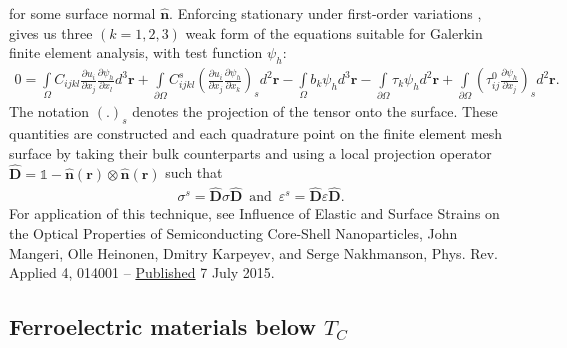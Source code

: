 \documentclass[22pt]{article} %
\begin{document}
%
for some surface normal $\mathbf{\hat{n}}$.
%
Enforcing stationary under first-order variations \cite{BowerBook}, gives us three $(k = 1,2,3)$ weak form of the equations suitable for Galerkin finite element analysis, with test function $\psi_h$:
%
\begin{align}\tag{3.8}
 0 = \int\limits_\Omega C_{ijkl} \frac{\partial u_i}{\partial x_j} \frac{\partial \psi_h}{\partial x_l} d^3 \textbf{r} + \int\limits_{\partial \Omega} C_{ijkl}^s \left(\frac{\partial u_i}{\partial x_j} \frac{\partial \psi_h}{\partial x_k} \right)_s d^2 \textbf{r} - \int\limits_\Omega b_k \psi_h d^3 \textbf{r} - \int\limits_{\partial \Omega} \tau_k \psi_h d^2 \textbf{r} + \int\limits_{\partial \Omega} \left(\tau_{ij}^0 \frac{\partial \psi_h}{\partial x_j} \right)_s d^2 \textbf{r}.
\end{align}
%
The notation $\left( . \right)_s$ denotes the projection of the tensor onto the surface.
%
These quantities are constructed and each quadrature point on the finite element mesh surface by taking their bulk counterparts and using a local projection operator $\mathbf{\hat{\textbf{D}}} = \mathds{1} - \mathbf{\hat{n}}(\textbf{r}) \otimes \mathbf{\hat{n}} (\textbf{r})$ \cite{Yvonnet2012} such that 
%
\begin{align}\tag{3.9}
\sigma^s = \mathbf{\hat{\textbf{D}}} \sigma \mathbf{\hat{\textbf{D}}} \,\,\,\mathrm{and}\,\,\, \varepsilon^s = \mathbf{\hat{\textbf{D}}} \varepsilon \mathbf{\hat{\textbf{D}}}.
\end{align}
%
For application of this technique, see Influence of Elastic and Surface Strains on the Optical Properties of Semiconducting Core-Shell Nanoparticles,
John Mangeri, Olle Heinonen, Dmitry Karpeyev, and Serge Nakhmanson, Phys. Rev. Applied 4, 014001 -- \href{http://journals.aps.org/prapplied/abstract/10.1103/PhysRevApplied.4.014001}{Published}  7 July 2015. 
%

%
\subsection{Ferroelectric materials below $T_C$}
%

%
\end{document}
